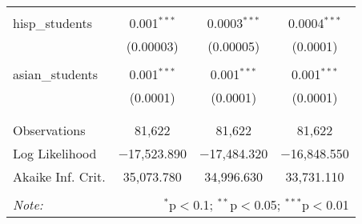 \begin{table}[!htbp]
\begin{tabular}{@{\extracolsep{-2pt}}lccc}
  & & & \\ 
 hisp\_students & 0.001$^{***}$ & 0.0003$^{***}$ & 0.0004$^{***}$ \\ 
  & (0.00003) & (0.00005) & (0.0001) \\ 
  & & & \\ 
 asian\_students & 0.001$^{***}$ & 0.001$^{***}$ & 0.001$^{***}$ \\ 
  & (0.0001) & (0.0001) & (0.0001) \\ 
  & & & \\ 
\hline \\[-1.8ex] 
Observations & 81,622 & 81,622 & 81,622 \\ 
Log Likelihood & $-$17,523.890 & $-$17,484.320 & $-$16,848.550 \\ 
Akaike Inf. Crit. & 35,073.780 & 34,996.630 & 33,731.110 \\ 
\hline 
\hline \\[-1.8ex] 
\textit{Note:}  & \multicolumn{3}{r}{$^{*}$p$<$0.1; $^{**}$p$<$0.05; $^{***}$p$<$0.01} \\ 
\end{tabular} 
\end{table} 
